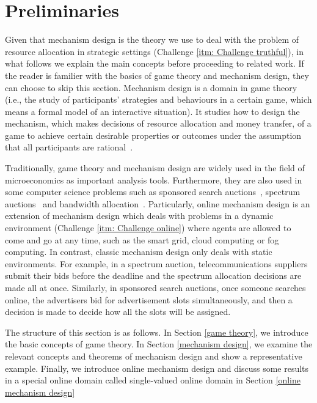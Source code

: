 \documentclass[11pt]{phdthesis}
\begin{document}
\section{Preliminaries} \label{preliminaries}
Given that mechanism design is the theory we use to deal with the problem of resource allocation in strategic settings (Challenge \ref{itm: Challenge truthful}), in what follows we explain the main concepts before proceeding to related work. If the reader is familier with the basics of game theory and mechanism design, they can choose to skip this section. Mechanism design is a domain in game theory (i.e., the study of participants' strategies and behaviours in a certain game, which means a formal model of an interactive situation). It studies how to design the mechanism, which makes decisions of resource allocation and money transfer, of a game to achieve certain desirable properties or outcomes under the assumption that all participants are rational~\citep{hurwicz1973design}. 

Traditionally, game theory and mechanism design are widely used in the field of microeconomics as important analysis tools. Furthermore, they are also used in some computer science problems such as sponsored search auctions~\citep{zhu2012truthful}, spectrum auctions~\citep{qin2015sponsored} and bandwidth allocation~\citep{wu2012auction}. Particularly, online mechanism design is an extension of mechanism design which deals with problems in a dynamic environment (Challenge \ref{itm: Challenge online}) where agents are allowed to come and go at any time, such as the smart grid, cloud computing or fog computing. In contrast, classic mechanism design only deals with static environments. For example, in a spectrum auction, telecommunications suppliers submit their bids before the deadline and the spectrum allocation decisions are made all at once. Similarly, in sponsored search auctions, once someone searches online, the advertisers bid for advertisement slots simultaneously, and then a decision is made to decide how all the slots will be assigned. 

The structure of this section is as follows. 
In Section \ref{game theory}, we introduce the basic concepts of game theory. In Section \ref{mechanism design}, we examine the relevant concepts and theorems of mechanism design and show a representative example. Finally, we introduce online mechanism design and discuss some results in a special online domain called single-valued online domain in Section \ref{online mechanism design}
\end{document}
